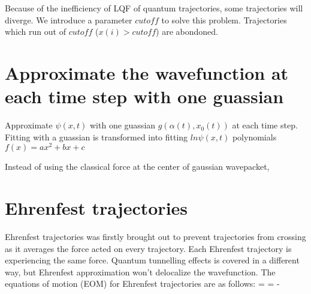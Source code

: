 Because of the inefficiency of LQF of quantum trajectories, some trajectories will diverge. We introduce a parameter $cutoff$ to solve this problem. 
Trajectories which run out of $cutoff$ ($x(i) > cutoff$) are abondoned. 
  


%
%
%

\section{Approximate the wavefunction at each time step with one guassian}
Approximate $\psi(x,t)$ with one guassian $g(\alpha(t),x_0(t))$ at each time step. 
Fitting with a guassian is transformed into fitting $ln\psi(x,t)$ polynomials $f(x) = ax^2+bx+c$

Instead of using the classical force at the center of gaussian wavepacket, 


\newpage
\section{Ehrenfest trajectories}
Ehrenfest trajectories was firstly brought out to prevent trajectories from crossing as it averages the force acted on every 
trajectory. Each Ehrenfest trajectory is experiencing the same force. Quantum tunnelling effects is covered in a different way, 
but Ehrenfest approximation won't delocalize the wavefunction.
The equations of motion (EOM) for Ehrenfest trajectories are as follows:
\be {} =  \ee 
\be {} = \bra - \ket \ee 


